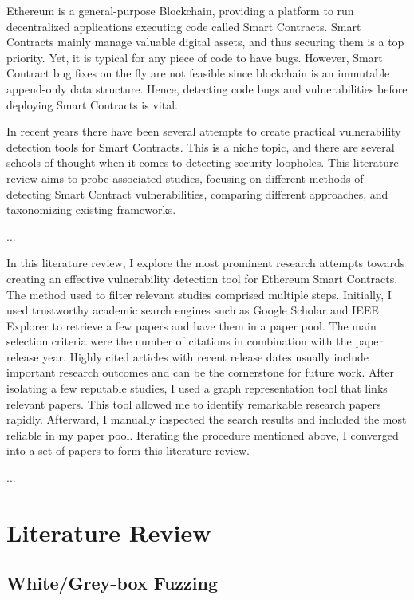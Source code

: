 \documentclass[a4paper,11pt]{article}
\begin{document}
Ethereum is a general-purpose Blockchain, providing a platform to run
decentralized applications executing code called Smart Contracts. Smart Contracts
mainly manage valuable digital assets, and thus securing them is a top priority.
Yet, it is typical for any piece of code to have bugs. However, Smart Contract
bug fixes on the fly are not feasible since blockchain is an immutable
append-only data structure. Hence, detecting code bugs and vulnerabilities
before deploying Smart Contracts is vital.

In recent years there have been several attempts to create practical
vulnerability detection tools for Smart Contracts. This is a niche topic, and
there are several schools of thought when it comes to detecting security
loopholes. This literature review aims to probe associated studies, focusing on
different methods of detecting Smart Contract vulnerabilities, comparing
different approaches, and taxonomizing existing frameworks.

...

In this literature review, I explore the most prominent research attempts
towards creating an effective vulnerability detection tool for Ethereum Smart
Contracts. The method used to filter relevant studies comprised multiple steps.
Initially, I used trustworthy academic search engines such as Google Scholar and
IEEE Explorer to retrieve a few papers and have them in a paper pool. The main
selection criteria were the number of citations in combination with the paper
release year. Highly cited articles with recent release dates usually include
important research outcomes and can be the cornerstone for future work. After
isolating a few reputable studies, I used a graph representation tool
\cite{connectedpapers} that links relevant papers. This tool allowed me to
identify remarkable research papers rapidly. Afterward, I manually inspected the
search results and included the most reliable in my paper pool. Iterating the
procedure mentioned above, I converged into a set of papers to form this
literature review.

...

\section{Literature Review}

\subsection{White/Grey-box Fuzzing}
\end{document}
